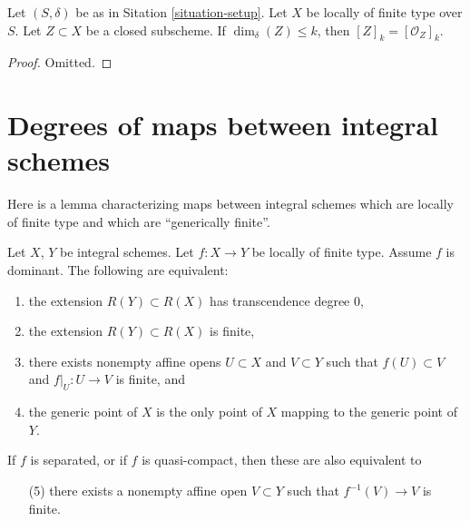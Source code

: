\begin{lemma}
\label{lemma-cycle-closed-coherent}
Let $(S, \delta)$ be as in Sitation \ref{situation-setup}.
Let $X$ be locally of finite type over $S$.
Let $Z \subset X$ be a closed subscheme.
If $\dim_\delta(Z) \leq k$, then $[Z]_k = [{\mathcal O}_Z]_k$.
\end{lemma}

\begin{proof}
Omitted.
\end{proof}





\section{Degrees of maps between integral schemes}
\label{section-degrees}

\noindent
Here is a lemma characterizing maps between integral schemes
which are locally of finite type and which are ``generically finite''.

\begin{lemma}
\label{lemma-finite-degree}
Let $X$, $Y$ be integral schemes.
Let $f : X \to Y$ be locally of finite type.
Assume $f$ is dominant.
The following are equivalent:
\begin{enumerate}
\item the extension $R(Y) \subset R(X)$ has
transcendence degree $0$,
\item the extension $R(Y) \subset R(X)$ is finite,
\item there exists nonempty affine opens $U \subset X$
and $V \subset Y$ such that $f(U) \subset V$
and $f|_U : U \to V$ is finite, and
\item the generic point of $X$ is the only point of $X$ mapping to
the generic point of $Y$.
\end{enumerate}
If $f$ is separated, or if $f$ is quasi-compact, then these are
also equivalent to
\begin{enumerate}
\item[(5)] there exists a nonempty affine open $V \subset Y$ such
that $f^{-1}(V) \to V$ is finite.
\end{enumerate}
\end{lemma}


